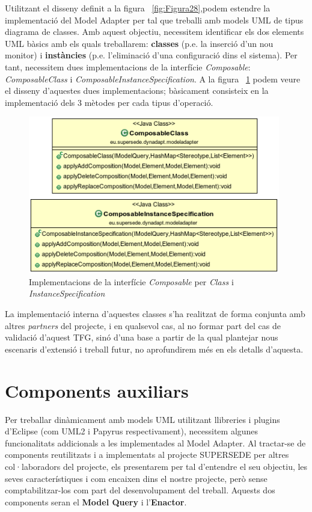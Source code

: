 Utilitzant el disseny definit a la figura ~\ref{fig:Figura28},podem estendre la implementació del Model Adapter per tal que treballi amb models UML de tipus diagrama de classes. Amb aquest objectiu, necessitem identificar els dos elements UML bàsics amb els quals treballarem: \textbf{classes} (p.e. la inserció d'un nou monitor) i \textbf{instàncies} (p.e. l'eliminació d'una configuració dins el sistema). Per tant, necessitem dues implementacions de la interfície \textit{Composable}: \textit{ComposableClass} i \textit{ComposableInstanceSpecification}. A la figura ~\ref{fig:Figura31} podem veure el disseny d'aquestes dues implementacions; bàsicament consisteix en la implementació dels 3 mètodes per cada tipus d'operació.\\

\begin{figure}
\centering
\includegraphics[width=11cm]{Figures/Figure31}
\decoRule
\caption{Implementacions de la interfície \textit{Composable} per \textit{Class} i \textit{InstanceSpecification}}
\label{fig:Figura31}
\end{figure}  

La implementació interna d'aquestes classes s'ha realitzat de forma conjunta amb altres \textit{partners} del projecte, i en qualsevol cas, al no formar part del cas de validació d'aquest TFG, sinó d'una base a partir de la qual plantejar nous escenaris d'extensió i treball futur, no aprofundirem més en els detalls d'aquesta.\\

\section{Components auxiliars}

Per treballar dinàmicament amb models UML utilitzant llibreries i plugins d'Eclipse (com UML2 i Papyrus respectivament), necessitem algunes funcionalitats addicionals a les implementades al Model Adapter. Al tractar-se de components reutilitzats i a implementats al projecte SUPERSEDE per altres col·laboradors del projecte, els presentarem per tal d'entendre el seu objectiu, les seves característiques i com encaixen dins el nostre projecte, però sense comptabilitzar-los com part del desenvolupament del treball. Aquests dos components seran el \textbf{Model Query} i l'\textbf{Enactor}.

